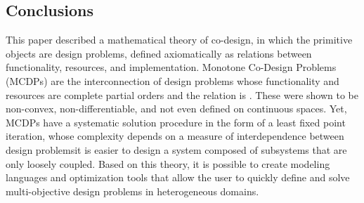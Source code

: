 \subsection{Conclusions}

This paper described a mathematical theory of co-design, in which
the primitive objects are design problems, defined axiomatically as
relations between functionality, resources, and implementation. Monotone
Co-Design Problems (MCDPs) are the interconnection of design problems
whose functionality and resources are complete partial orders and
the relation is \scottcontinuous. These were shown to be non-convex,
non-differentiable, and not even defined on continuous spaces. Yet,
MCDPs have a systematic solution procedure in the form of a least
fixed point iteration, whose complexity depends on a measure of interdependence
between design problems\textemdash it is easier to design a system
composed of subsystems that are only loosely coupled. Based on this
theory, it is possible to create modeling languages and optimization
tools that allow the user to quickly define and solve multi-objective
design problems in heterogeneous domains. 






